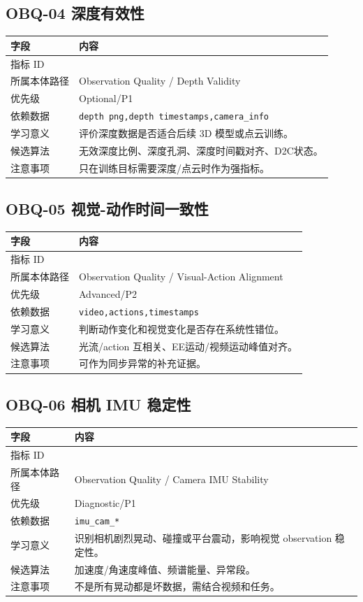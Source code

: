 \documentclass[UTF8,zihao=-4]{ctexart}
\newcommand{\Code}[1]{\texttt{#1}}
\newcommand{\MID}[1]{\texttt{\seqsplit{#1}}}
\begin{document}
\subsection{OBQ-04 深度有效性}

\begin{longtable}{L{3.6cm} L{9.6cm}}
\toprule
字段 & 内容 \\
\midrule
指标 ID & \MID{OBQ-04} \\
所属本体路径 & Observation Quality / Depth Validity \\
优先级 & Optional/P1 \\
依赖数据 & \Code{depth png,depth timestamps,camera\_info} \\
学习意义 & 评价深度数据是否适合后续 3D 模型或点云训练。 \\
候选算法 & 无效深度比例、深度孔洞、深度时间戳对齐、D2C状态。 \\
注意事项 & 只在训练目标需要深度/点云时作为强指标。 \\
\bottomrule
\end{longtable}

\subsection{OBQ-05 视觉-动作时间一致性}

\begin{longtable}{L{3.6cm} L{9.6cm}}
\toprule
字段 & 内容 \\
\midrule
指标 ID & \MID{OBQ-05} \\
所属本体路径 & Observation Quality / Visual-Action Alignment \\
优先级 & Advanced/P2 \\
依赖数据 & \Code{video,actions,timestamps} \\
学习意义 & 判断动作变化和视觉变化是否存在系统性错位。 \\
候选算法 & 光流/action 互相关、EE运动/视频运动峰值对齐。 \\
注意事项 & 可作为同步异常的补充证据。 \\
\bottomrule
\end{longtable}

\subsection{OBQ-06 相机 IMU 稳定性}

\begin{longtable}{L{3.6cm} L{9.6cm}}
\toprule
字段 & 内容 \\
\midrule
指标 ID & \MID{OBQ-06} \\
所属本体路径 & Observation Quality / Camera IMU Stability \\
优先级 & Diagnostic/P1 \\
依赖数据 & \Code{imu\_cam\_*} \\
学习意义 & 识别相机剧烈晃动、碰撞或平台震动，影响视觉 observation 稳定性。 \\
候选算法 & 加速度/角速度峰值、频谱能量、异常段。 \\
注意事项 & 不是所有晃动都是坏数据，需结合视频和任务。 \\
\bottomrule
\end{longtable}
\end{document}
